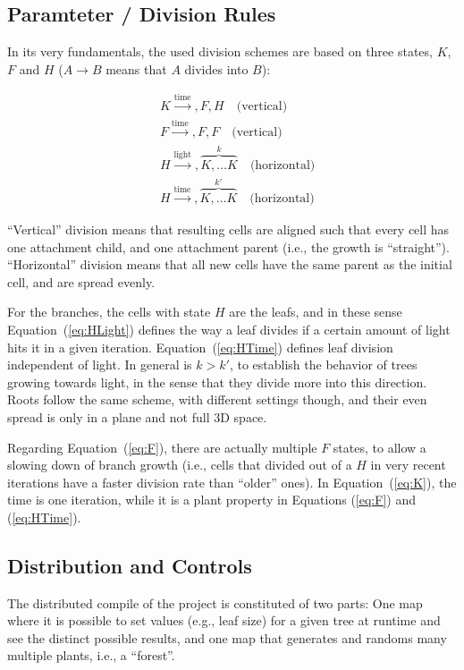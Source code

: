 \documentclass[11pt, abstract=on]{scrartcl}
\begin{document}
\subsection{Paramteter / Division Rules}
In its very fundamentals, the used division schemes are based on three states, $K$, $F$ and $H$ ($A \rightarrow B$ means that $A$ divides into $B$):

\begin{align}
	&K \xrightarrow {\text{time}}, F, H \quad \text{(vertical)} \label{eq:K} \\
	&F \xrightarrow {\text{time}}, F, F \quad \text{(vertical)} \label{eq:F}\\
	&H \xrightarrow {\text{light}}, \overbrace{ K, \ldots K}^{k} \quad \text{(horizontal)}  \label{eq:HLight} \\
	&H \xrightarrow {\text{time}}, \overbrace{ K, \ldots K}^{k'} \quad \text{(horizontal)} \label{eq:HTime}
\end{align}

``Vertical'' division means that resulting cells are aligned such that every cell has one attachment child, and one attachment parent (i.e., the growth is ``straight''). ``Horizontal'' division means that all new cells have the same parent as the initial cell, and are spread evenly.

For the branches, the cells with state $H$ are the leafs, and in these sense Equation~(\ref{eq:HLight}) defines the way a leaf divides if a certain amount of light hits it in a given iteration. Equation~(\ref{eq:HTime}) defines leaf division independent of light. In general is $k > k'$, to establish the behavior of trees growing towards light, in the sense that they divide more into this direction. Roots follow the same scheme, with different settings though, and their even spread is only in a plane and not full 3D space.

Regarding Equation~(\ref{eq:F}), there are actually multiple $F$ states, to allow a slowing down of branch growth (i.e., cells that divided out of a $H$ in very recent iterations have a faster division rate than ``older'' ones). In Equation~(\ref{eq:K}), the time is one iteration, while it is a plant property in Equations (\ref{eq:F}) and (\ref{eq:HTime}).

\subsection{Distribution and Controls}
The distributed compile of the project is constituted of two parts: One map where it is possible to set values (e.g., leaf size) for a given tree at runtime and see the distinct possible results, and one map that generates and randoms many multiple plants, i.e., a ``forest''.
\end{document}
